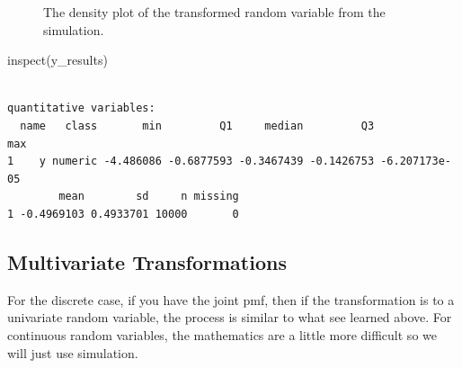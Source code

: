 \documentclass[
  letterpaper,
  DIV=11,
  numbers=noendperiod]{scrreprt}
\newenvironment{Shaded}{\begin{snugshade}}{\end{snugshade}}
\newcommand{\FunctionTok}[1]{\textcolor[rgb]{0.28,0.35,0.67}{#1}}
\newcommand{\NormalTok}[1]{\textcolor[rgb]{0.00,0.23,0.31}{#1}}
\begin{document}
\begin{figure}[H]


\caption{\label{fig-dens162}The density plot of the transformed random
variable from the simulation.}

\end{figure}%

\begin{Shaded}
\begin{Highlighting}[]
\FunctionTok{inspect}\NormalTok{(y\_results)}
\end{Highlighting}
\end{Shaded}

\begin{verbatim}

quantitative variables:  
  name   class       min         Q1     median         Q3           max
1    y numeric -4.486086 -0.6877593 -0.3467439 -0.1426753 -6.207173e-05
        mean        sd     n missing
1 -0.4969103 0.4933701 10000       0
\end{verbatim}

\subsection{Multivariate
Transformations}\label{multivariate-transformations}

For the discrete case, if you have the joint pmf, then if the
transformation is to a univariate random variable, the process is
similar to what see learned above. For continuous random variables, the
mathematics are a little more difficult so we will just use simulation.
\end{document}
